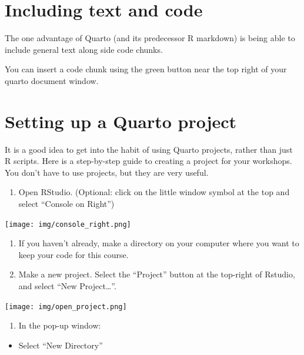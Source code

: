 \documentclass[
  letterpaper,
  DIV=11,
  numbers=noendperiod]{scrreprt}
\providecommand{\tightlist}{%
  \setlength{\itemsep}{0pt}\setlength{\parskip}{0pt}}\usepackage{longtable,booktabs,array}
\begin{document}
\hypertarget{including-text-and-code}{%
\chapter{Including text and code}\label{including-text-and-code}}

The one advantage of Quarto (and its predecessor R markdown) is being
able to include general text along side code chunks.

You can insert a code chunk using the green button near the top right of
your quarto document window.

\hypertarget{setting-up-a-quarto-project}{%
\chapter{Setting up a Quarto
project}\label{setting-up-a-quarto-project}}

It is a good idea to get into the habit of using Quarto projects, rather
than just R scripts. Here is a step-by-step guide to creating a project
for your workshops. You don't have to use projects, but they are very
useful.

\begin{enumerate}
\def\labelenumi{\arabic{enumi}.}
\tightlist
\item
  Open RStudio. (Optional: click on the little window symbol at the top
  and select ``Console on Right'')
\end{enumerate}

\texttt{[image: img/console\_right.png]}

\begin{enumerate}
\def\labelenumi{\arabic{enumi}.}
\setcounter{enumi}{1}
\item
  If you haven't already, make a directory on your computer where you
  want to keep your code for this course.
\item
  Make a new project. Select the ``Project'' button at the top-right of
  Rstudio, and select ``New Project\ldots{}''.
\end{enumerate}

\texttt{[image: img/open\_project.png]}

\begin{enumerate}
\def\labelenumi{\arabic{enumi}.}
\setcounter{enumi}{3}
\tightlist
\item
  In the pop-up window:
\end{enumerate}

\begin{itemize}
\tightlist
\item
  Select ``New Directory''
\end{itemize}
\end{document}
